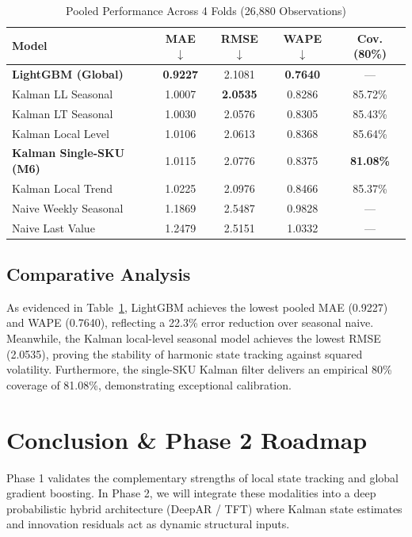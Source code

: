 \documentclass[conference]{IEEEtran}
\begin{document}
\begin{table}[htbp]
\caption{Pooled Performance Across 4 Folds (26,880 Observations)}
\begin{center}
\begin{tabular}{lcccc}
\toprule
\textbf{Model} & \textbf{MAE $\downarrow$} & \textbf{RMSE $\downarrow$} & \textbf{WAPE $\downarrow$} & \textbf{Cov. (80\%)} \\
\midrule
\textbf{LightGBM (Global)} & \textbf{0.9227} & 2.1081 & \textbf{0.7640} & --- \\
Kalman LL Seasonal & 1.0007 & \textbf{2.0535} & 0.8286 & 85.72\% \\
Kalman LT Seasonal & 1.0030 & 2.0576 & 0.8305 & 85.43\% \\
Kalman Local Level & 1.0106 & 2.0613 & 0.8368 & 85.64\% \\
\textbf{Kalman Single-SKU (M6)} & 1.0115 & 2.0776 & 0.8375 & \textbf{81.08\%} \\
Kalman Local Trend & 1.0225 & 2.0976 & 0.8466 & 85.37\% \\
Naive Weekly Seasonal & 1.1869 & 2.5487 & 0.9828 & --- \\
Naive Last Value & 1.2479 & 2.5151 & 1.0332 & --- \\
\bottomrule
\end{tabular}
\label{tab:results}
\end{center}
\end{table}

\subsection{Comparative Analysis}
As evidenced in Table~\ref{tab:results}, LightGBM achieves the lowest pooled MAE (0.9227) and WAPE (0.7640), reflecting a 22.3\% error reduction over seasonal naive. Meanwhile, the Kalman local-level seasonal model achieves the lowest RMSE (2.0535), proving the stability of harmonic state tracking against squared volatility. Furthermore, the single-SKU Kalman filter delivers an empirical 80\% coverage of 81.08\%, demonstrating exceptional calibration.

\section{Conclusion \& Phase 2 Roadmap}
Phase 1 validates the complementary strengths of local state tracking and global gradient boosting. In Phase 2, we will integrate these modalities into a deep probabilistic hybrid architecture (DeepAR / TFT) where Kalman state estimates and innovation residuals act as dynamic structural inputs.
\end{document}
